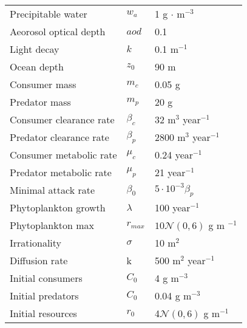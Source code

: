 \begin{tabular}{l  l  l}
  Precipitable water & $w_a$ & 1 g $\cdot$ m$^{-3}$\\
  Aeorosol optical depth & $aod$ & 0.1 \\
  Light decay & $k$ & 0.1 m$^{-1}$\\
  Ocean depth & $z_0$ & 90 m \\
  Consumer mass & $m_c$ & 0.05 g \\
  Predator mass & $m_p$ & 20 g \\
  Consumer clearance rate & $\beta_c$ & 32 m$^{3}$ year$^{-1}$ \\
  Predator clearance rate & $\beta_p$ & 2800 m$^3$ year$^{-1}$ \\
  Consumer metabolic rate & $\mu_c$ & 0.24 year$^{-1}$ \\
  Predator metabolic rate & $\mu_p$ & 21 year$^{-1}$ \\
  Minimal attack rate & $\beta_0$ & $5 \cdot 10^{-3} \beta_p$ \\
  Phytoplankton growth & $\lambda$ & 100 year$^{-1}$ \\
  Phytoplankton max & $r_{max}$ & $10\mathcal{N}(0,6)$ g m $^{-1}$ \\
  Irrationality & $\sigma$ & 10 m$^2$ \\
  Diffusion rate & k & 500 m$^{2}$ year$^{-1}$ \\
  Initial consumers & $C_0$ & 4  g m$^{-3}$ \\
  Initial predators & $C_0$ & 0.04  g m$^{-3}$ \\
  Initial resources & $r_0$ & 4$\mathcal{N}(0,6)$ g m$^{-1}$
\end{tabular}

